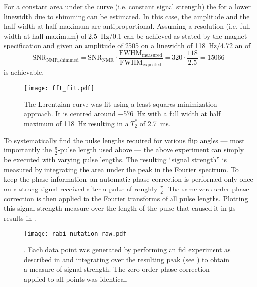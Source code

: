 For a constant area under the curve (i.e. constant signal strength) the \snrnmr{} for a lower linewidth due to shimming can be estimated. In this case, the amplitude and the half width at half maximum are antiproportional. Assuming a resolution (i.e. full width at half maximum) of \qty{2.5}{\hertz}/\qty{0.1}{\partspermillion} can be achieved as stated by the magnet specification and given an amplitude of 2505 on a linewidth of \qty{118}{\hertz}/\qty{4.72}{\partspermillion} an \snrnmr{} of
\[
    \text{SNR}_{\text{NMR,shimmed}} = \text{SNR}_{\text{NMR}} \cdot \frac{\text{FWHM}_{\text{measured}}}{\text{FWHM}_{\text{expected}}} = 320 \cdot \frac{118}{2.5} = \num{15066}
\]
is achievable.

\begin{figure}[h!bt]
    \centering
    \texttt{[image: fft\_fit.pdf]}
    \caption{ The Lorentzian curve was fit using a least-squares minimization approach. It is centred around \qty{-576}{\hertz} with a full width at half maximum of \qty{118}{\hertz} resulting in a \(T_2^*\) of \qty{2.7}{\milli\second}.}
\end{figure}

To systematically find the pulse lengths required for various flip angles --- most importantly the \(\frac{\pi}{2}\)-pulse length used above --- the above experiment can simply be executed with varying pulse lengths. The resulting \enquote{signal strength} is measured by integrating the area under the peak in the Fourier spectrum. To keep the phase information, an automatic phase correction is performed only once on a strong signal received after a pulse of roughly \(\frac{\pi}{2}\). The same zero-order phase correction is then applied to the Fourier transforms of all pulse lengths. Plotting this signal strength measure over the length of the pulse that caused it in \unit{\micro\second} results in .

\begin{figure}[h!bt]
    \centering
    \texttt{[image: rabi\_nutation\_raw.pdf]}
    \caption{. Each data point was generated by performing an \acrshort{fid} experiment as described in  and integrating over the resulting peak (see ) to obtain a measure of signal strength. The zero-order phase correction applied to all points was identical.}
\end{figure}

